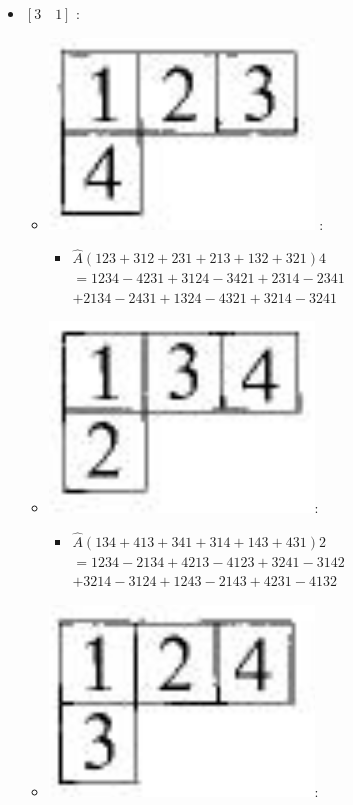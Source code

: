 \documentclass[12pt,a4paper]{article}
\begin{document}
\begin{itemize}
\item  $\left[ 3\quad 1\right]$ :
\begin{itemize}
\item  \includegraphics[scale=0.2]{build/young-31-123.png} : 
\begin{itemize}
 \item  $ \hat{A} \left( 123 +  312 + 231 + 213 + 132 +  321\right) 4$ \\
 $ = 1234 - 4231 + 3124 - 3421  + 2314 - 2341  $ \\ 
 $ + 2134 - 2431 + 1324 - 4321 + 3214 - 3241$
\end{itemize}
\item \includegraphics[scale=0.2]{build/young-31-134.png}: 
\begin{itemize}
 \item  $ \hat{A} \left( 134 + 413 + 341 + 314 + 143 + 431\right)2$ \\
 $ =1234 - 2134 + 4213 - 4123 + 3241 - 3142 $ \\
 $+ 3214 - 3124 + 1243 - 2143 + 4231 - 4132$
\end{itemize}
\item \includegraphics[scale=0.2]{build/young-31-124.png}: 

\end{itemize}
\end{itemize}
\end{document}
